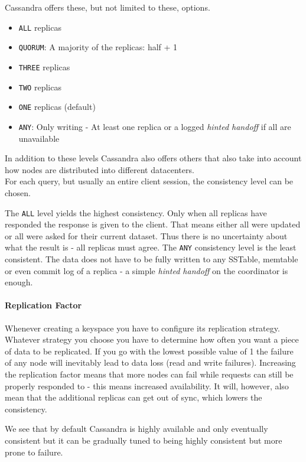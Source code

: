 Cassandra offers these, but not limited to these, options. \autocite{datastax_consistency_level}

\begin{itemize}
  \item \texttt{ALL} replicas
  \item \texttt{QUORUM}: A majority of the replicas: half + 1
  \item \texttt{THREE} replicas
  \item \texttt{TWO} replicas
  \item \texttt{ONE} replicas (default)
  \item \texttt{ANY}: Only writing - At least one replica or a logged \textit{hinted handoff} if all are unavailable
\end{itemize}

In addition to these levels Cassandra also offers others that also take into account how nodes are distributed into different datacenters. \\
For each query, but usually an entire client session, the consistency level can be chosen.

The \texttt{ALL} level yields the highest consistency. Only when all replicas have responded the response is given to the client. That means either all were updated or all were asked for their current dataset. Thus there is no uncertainty about what the result is - all replicas must agree. The \texttt{ANY} consistency level is the least consistent. The data does not have to be fully written to any SSTable, memtable or even commit log of a replica - a simple \textit{hinted handoff} on the coordinator is enough. \autocite[6,7]{cassandraInCAPtheorem}

\paragraph{Replication Factor} Whenever creating a keyspace you have to configure its replication strategy. Whatever strategy you choose you have to determine how often you want a piece of data to be replicated. If you go with the lowest possible value of 1 the failure of any node will inevitably lead to data loss (read and write failures). Increasing the replication factor means that more nodes can fail while requests can still be properly responded to - this means increased availability. It will, however, also mean that the additional replicas can get out of sync, which lowers the consistency. \autocite[3]{cassandra_paper}

We see that by default Cassandra is highly available and only eventually consistent but it can be gradually tuned to being highly consistent but more prone to failure. \autocite[2,3]{cassandraInCAPtheorem}

